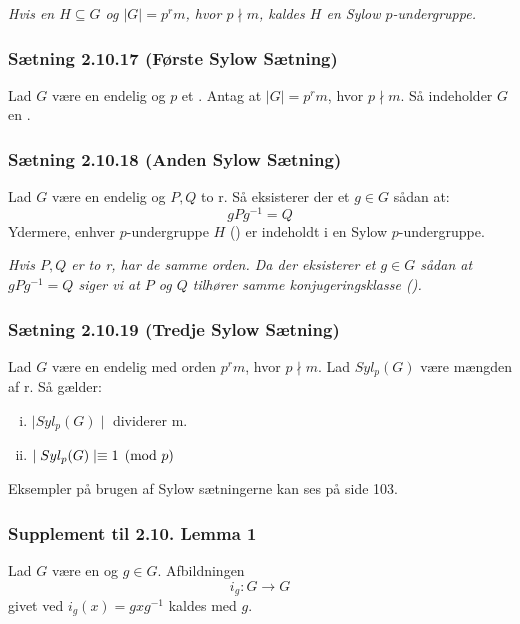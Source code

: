 \textit{Hvis en  $H \subseteq G$ og $\mid G\mid = p^r m$,
hvor $p \nmid m$, kaldes $H$ en Sylow $p$-undergruppe.}

\subsubsection{Sætning 2.10.17 (Første Sylow Sætning)}
Lad $G$ være en endelig  og $p$ et . Antag at
$\mid G\mid = p^r m$, hvor $p \nmid m$. Så indeholder $G$ en .

\subsubsection{Sætning 2.10.18 (Anden Sylow Sætning)}
Lad $G$ være en endelig  og $P, Q$ to r. Så eksisterer der et $g \in G$ sådan at:
\begin{equation*}
  gPg^{-1} = Q
\end{equation*}
Ydermere, enhver $p$-undergruppe $H$ () er indeholdt i en
Sylow $p$-undergruppe.

\textit{Hvis $P, Q$ er to r, har de samme orden. Da
der eksisterer et $g \in G$ sådan at $gPg^{-1} = Q$ siger vi at $P$ og $Q$
tilhører samme konjugeringsklasse ().}

\subsubsection{Sætning 2.10.19 (Tredje Sylow Sætning)}
Lad $G$ være en endelig  med orden $p^r m$, hvor $p \nmid m$.
Lad $Syl_p (G)$ være mængden af r. Så gælder:
\begin{enumerate}[(i)]
  \item $\mid Syl_p (G)\mid$ dividerer m.
  \item $\mid Syl_p (G)\mid \equiv 1 \pmod{p}$
\end{enumerate}
Eksempler på brugen af Sylow sætningerne kan ses på side 103.

\subsubsection{Supplement til 2.10. Lemma 1}
Lad $G$ være en  og $g \in G$. Afbildningen 
\begin{equation*}
  i_g: G \rightarrow G
\end{equation*}
givet ved $i_g (x) = gxg^{-1}$ kaldes  med $g$.

